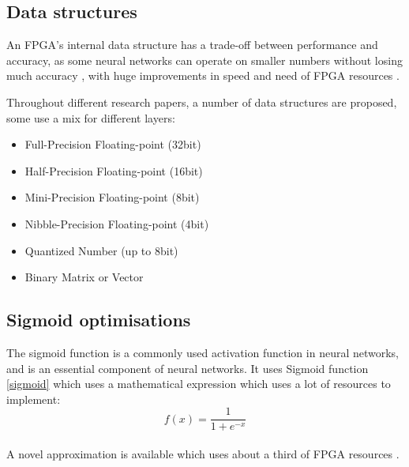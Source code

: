 \subsection{Data structures}
\label{sec:fpga_data_structures}

An FPGA's internal data structure has a trade-off between performance and accuracy, as some neural networks can operate on smaller numbers without losing much accuracy \autocite{8330546}, with huge improvements in speed and need of FPGA resources \autocite{omondi_rajapakse_2006}. 

Throughout different research papers, a number of data structures are proposed, some use a mix for different layers:
\begin{itemize}
	\item Full-Precision Floating-point (32bit)
	\item Half-Precision Floating-point (16bit) \autocite{6927383,8108073}
	\item Mini-Precision Floating-point (8bit) \autocite{6927383}
	\item Nibble-Precision Floating-point (4bit) \autocite{6927383}
	\item Quantized Number (up to 8bit) \autocite{8702332,8280163,8330546}
	\item Binary Matrix or Vector \autocite{9039366,8280163,7929192}
\end{itemize}

\subsection{Sigmoid optimisations}
\label{sec:fpga_sigmoid}
The sigmoid function is a commonly used activation function in neural networks, and is an essential component of neural networks. It uses Sigmoid function \ref{sigmoid} which uses a mathematical expression which uses a lot of resources to implement:
\\
\begin{equation}\label{sigmoid}
    f(x) = \frac{1}{1+e^{-x}}
\end{equation}
\\
A novel approximation is available which uses about a third of FPGA resources \autocite{9027479}.


